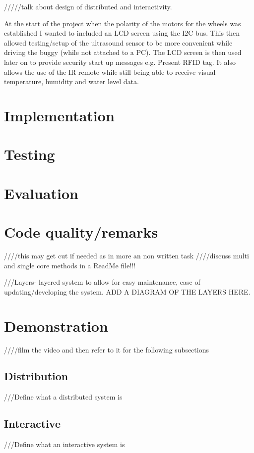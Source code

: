 \documentclass[8pt, a4paper]{article}
\begin{document}
 


/////talk about design of distributed and interactivity. 

At the start of the project when the polarity of the motors for the wheels was established I wanted to included an LCD screen using the I2C bus. This then allowed testing/setup of the ultrasound sensor to be more convenient while driving the buggy (while not attached to a PC). The LCD screen is then used later on to provide security start up messages e.g. Present RFID tag. It also allows the use of the IR remote while still being able to receive visual temperature, humidity and water level data.  


\section{Implementation}


\section{Testing}

\section{Evaluation}


\section{Code quality/remarks} ////this may get cut if needed as in more an non written task
////discuss multi and single core methods in a ReadMe file!!!


///Layers- layered system to allow for easy maintenance, ease of updating/developing the system. ADD A DIAGRAM OF THE LAYERS HERE. 


\section{Demonstration}
////film the video and then refer to it for the following subsections


\subsection{Distribution}
///Define what a distributed system is 

\subsection{Interactive}
///Define what an interactive system is
\end{document}
